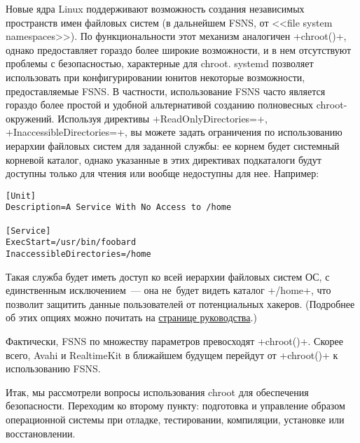 \documentclass[10pt,oneside,a4paper]{article}
\begin{document}
Новые ядра Linux поддерживают возможность создания независимых пространств имен
файловых систем (в дальнейшем FSNS, от <<file system namespaces>>). По
функциональности этот механизм аналогичен +chroot()+, однако предоставляет
гораздо более широкие возможности, и в нем отсутствуют проблемы с безопасностью,
характерные для chroot. systemd позволяет использовать при конфигурировании
юнитов некоторые возможности, предоставляемые FSNS. В частности, использование
FSNS часто является гораздо более простой и удобной альтернативой созданию
полновесных chroot-окружений. Используя директивы +ReadOnlyDirectories=+,
+InaccessibleDirectories=+, вы можете задать ограничения по использованию
иерархии файловых систем для заданной службы: ее корнем будет системный корневой
каталог, однако указанные в этих директивах подкаталоги будут доступны только 
для чтения или вообще недоступны для нее. Например:
\begin{Verbatim}
[Unit]
Description=A Service With No Access to /home

[Service]
ExecStart=/usr/bin/foobard
InaccessibleDirectories=/home
\end{Verbatim}

Такая служба будет иметь доступ ко всей иерархии файловых систем ОС, с
единственным исключением~--- она не~будет видеть каталог +/home+, что позволит
защитить данные пользователей от потенциальных хакеров. (Подробнее об этих
опциях можно почитать на
\href{http://www.freedesktop.org/software/systemd/man/systemd.exec.html}%
{странице руководства}.)

Фактически, FSNS по множеству параметров превосходят +chroot()+. Скорее всего,
Avahi и RealtimeKit в ближайшем будущем перейдут от +chroot()+ к использованию
FSNS.

Итак, мы рассмотрели вопросы использования chroot для обеспечения безопасности.
Переходим ко второму пункту: подготовка и управление образом операционной
системы при отладке, тестировании, компиляции, установке или восстановлении.
\end{document}
